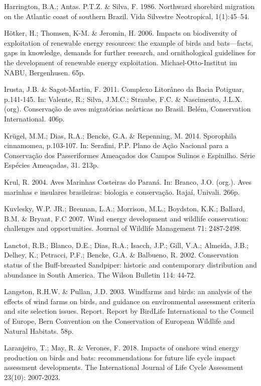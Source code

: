 \documentclass[
]{scrbook}
\begin{document}
Harrington, B.A.; Antas. P.T.Z. \& Silva, F. 1986. Northward shorebird migration on the Atlantic coast of southern Brazil. Vida Silvestre Neotropical, 1(1):45--54.

Hötker, H.; Thomsen, K-M. \& Jeromin, H. 2006. Impacts on biodiversity of exploitation of renewable energy resources: the example of birds and bats---facts, gaps in knowledge, demands for further research, and ornithological guidelines for the development of renewable energy exploitation. Michael-Otto-Institut im NABU, Bergenhusen. 65p.

Irusta, J.B. \& Sagot-Martin, F. 2011. Complexo Litorâneo da Bacia Potiguar, p.141-145. In: Valente, R.; Silva, J.M.C.; Straube, F.C. \& Nascimento, J.L.X. (org). Conservação de aves migratórias neárticas no Brasil. Belém, Conservation International. 406p.

Krügel, M.M.; Dias, R.A.; Bencke, G.A. \& Repenning, M. 2014. Sporophila cinnamomea, p.103-107. In: Serafini, P.P. Plano de Ação Nacional para a Conservação dos Passeriformes Ameaçados dos Campos Sulinos e Espinilho. Série Espécies Ameaçadas, 31. 213p.

Krul, R. 2004. Aves Marinhas Costeiras do Paraná. In: Branco, J.O. (org.). Aves marinhas e insulares brasileiras: biologia e conservação. Itajaí, Univali. 266p.

Kuvlesky, W.P. JR.; Brennan, L.A.; Morrison, M.L.; Boydston, K.K.; Ballard, B.M. \& Bryant, F.C 2007. Wind energy development and wildlife conservation: challenges and opportunities. Journal of Wildlife Management 71: 2487-2498.

Lanctot, R.B.; Blanco, D.E.; Dias, R.A.; Isacch, J.P.; Gill, V.A.; Almeida, J.B.; Delhey, K.; Petracci, P.F.; Bencke, G.A. \& Balbueno, R. 2002. Conservation status of the Buff-breasted Sandpiper: historic and contemporary distribution and abundance in South America. The Wilson Bulletin 114: 44-72.

Langston, R.H.W. \& Pullan, J.D. 2003. Windfarms and birds: an analysis of the effects of wind farms on birds, and guidance on environmental assessment criteria and site selection issues. Report. Report by BirdLife International to the Council of Europe, Bern Convention on the Conservation of European Wildlife and Natural Habitats. 58p.

Laranjeiro, T.; May, R. \& Verones, F. 2018. Impacts of onshore wind energy production on birds and bats: recommendations for future life cycle impact assessment developments. The International Journal of Life Cycle Assessment 23(10): 2007-2023.
\end{document}
